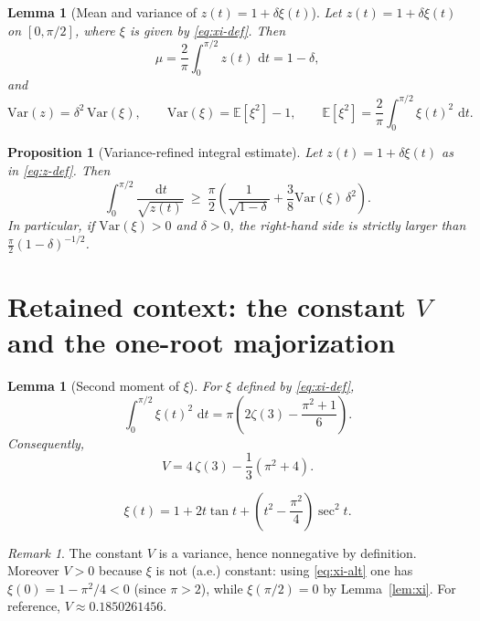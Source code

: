 \documentclass[10pt,a4paper]{amsart}
\newcommand{\E}{\mathbb{E}}
\newcommand{\Var}{\mathrm{Var}}
\newcommand{\dd}{\,\mathrm{d}}
\theoremstyle{plain}
\newtheorem{lemma}[theorem]{Lemma}
\newtheorem{proposition}[theorem]{Proposition}
\theoremstyle{remark}
\newtheorem{remark}[theorem]{Remark}
\begin{document}
\begin{lemma}[Mean and variance of $z(t)=1+\delta\xi(t)$]
\label{lem:meanvar-z}
Let $z(t)=1+\delta\xi(t)$ on $[0,\pi/2]$, where $\xi$ is given by \eqref{eq:xi-def}.
Then
\begin{equation}
\label{eq:mu-1-delta}
\mu = \frac{2}{\pi}\int_0^{\pi/2} z(t)\,\dd t = 1-\delta,
\end{equation}
and
\begin{equation}
\label{eq:var-z}
\Var(z)=\delta^2\,\Var(\xi),
\qquad
\Var(\xi)=\E[\xi^2]-1,
\qquad
\E[\xi^2]=\frac{2}{\pi}\int_0^{\pi/2}\xi(t)^2\,\dd t.
\end{equation}
\end{lemma}


\begin{proposition}[Variance-refined integral estimate]
\label{prop:refined-integral}
Let $z(t)=1+\delta\xi(t)$ as in \eqref{eq:z-def}.
Then
\begin{equation}
\label{eq:integral-refined}
\int_{0}^{\pi/2}\frac{\dd t}{\sqrt{z(t)}}
\ \ge\
\frac{\pi}{2}\left(\frac{1}{\sqrt{1-\delta}}+\frac{3}{8}\Var(\xi)\,\delta^2\right).
\end{equation}
In particular, if $\Var(\xi)>0$ and $\delta>0$, the right-hand side is strictly larger than $\frac{\pi}{2}(1-\delta)^{-1/2}$.
\end{proposition}


\section*{Retained context: the constant $V$ and the one-root majorization}

\begin{lemma}[Second moment of $\xi$]
\label{lem:xi-secondmoment}
For $\xi$ defined by \eqref{eq:xi-def},
\begin{equation}
\label{eq:xi-square-integral}
\int_{0}^{\pi/2}\xi(t)^2\,\dd t
=
\pi\left(2\zeta(3)-\frac{\pi^2+1}{6}\right).
\end{equation}
Consequently,
\begin{equation}
\label{eq:V-closedform}
V = 4\,\zeta(3)-\frac{1}{3}(\pi^2+4).
\end{equation}
\end{lemma}


\begin{equation}
\label{eq:xi-alt}
\xi(t) = 1 + 2t\tan t + \left(t^2-\frac{\pi^2}{4}\right)\sec^2 t.
\end{equation}


\begin{remark}\label{rem:V-positive}
The constant $V$ is a variance, hence nonnegative by definition.
Moreover $V>0$ because $\xi$ is not (a.e.) constant: using \eqref{eq:xi-alt} one has
\(\xi(0)=1-\pi^2/4<0\) (since $\pi>2$), while $\xi(\pi/2)=0$ by Lemma~\ref{lem:xi}.
For reference, $V\approx 0.1850261456$.
\end{remark}
\end{document}
